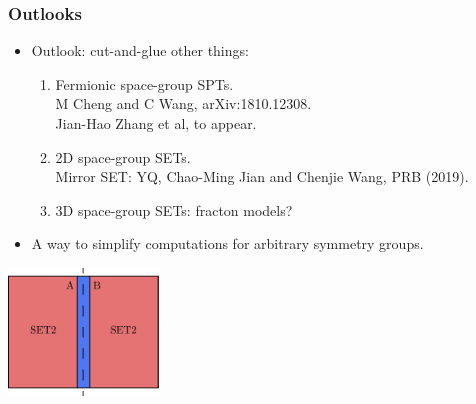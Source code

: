 \documentclass[xcolor=table, 10pt, aspectratio=43]{beamer}
\begin{document}
\begin{frame}
\frametitle{Outlooks}
\begin{itemize}
\item Outlook: cut-and-glue other things:
\begin{enumerate}
\item Fermionic space-group SPTs.\\
M Cheng and C Wang, arXiv:1810.12308.\\
Jian-Hao Zhang et al, to appear.
\item 2D space-group SETs.\\
Mirror SET: YQ, Chao-Ming Jian and Chenjie Wang, PRB (2019).
\item 3D space-group SETs: fracton models?
\end{enumerate}
\item A way to simplify computations for arbitrary symmetry groups.
\end{itemize}
\begin{center}
	\includegraphics[width=4cm]{mirstrip}
\end{center}
\end{frame}
\end{document}

